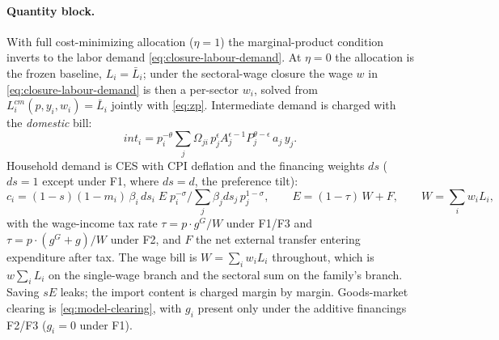 \paragraph{Quantity block.} With full cost-minimizing allocation
($\eta = 1$) the marginal-product condition inverts to the labor demand
\eqref{eq:closure-labour-demand}. At $\eta = 0$ the allocation is the
frozen baseline, $L_i = \bar{L}_i$; under the sectoral-wage closure the wage
$w$ in \eqref{eq:closure-labour-demand} is then a per-sector $w_i$, solved from
$L^{cm}_i(p, y_i, w_i) = \bar{L}_i$ jointly with \eqref{eq:zp}.
Intermediate demand is charged with the \emph{domestic}
bill:
\begin{equation}
int_i = p_i^{-\theta} \sum_j \Omega_{ji}\,
        p_j^{\epsilon} A_j^{\epsilon-1} P_j^{\theta-\epsilon}\, a_j\, y_j.
\label{eq:int}
\end{equation}
Household demand is CES with CPI deflation and the financing weights
$ds$ ($ds = 1$ except under F1, where $ds = d$, the preference tilt):
\begin{equation}
c_i = (1-s)(1-m_i)\,\beta_i\, ds_i\; E\; p_i^{-\sigma} \Big/
      \textstyle\sum_j \beta_j ds_j\, p_j^{1-\sigma},
\qquad
E = (1-\tau)\, W + F,
\qquad W = \textstyle\sum_i w_i L_i,
\label{eq:cons}
\end{equation}
with the wage-income tax rate $\tau = p\!\cdot\! g^G / W$ under
F1/F3 and $\tau = p\!\cdot\!(g^G + g)/W$ under F2, and $F$ the
net external transfer entering expenditure after tax. The wage bill is
$W = \sum_i w_i L_i$ throughout, which is $w \sum_i L_i$ on the single-wage
branch and the sectoral sum on the family's branch. Saving
$sE$ leaks; the import content is charged margin by margin. Goods-market
clearing is \eqref{eq:model-clearing}, with $g_i$ present only under the
additive financings F2/F3 ($g_i = 0$ under F1).

